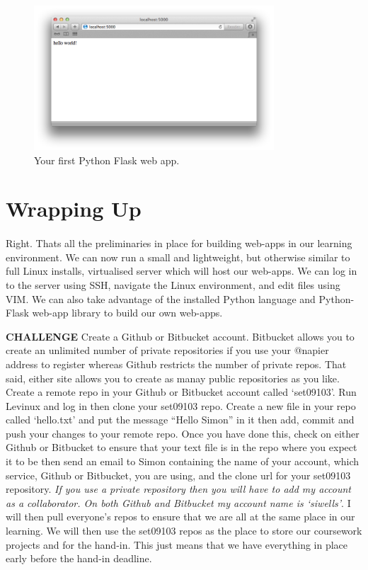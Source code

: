 \documentclass[12pt, a4paper, twoside]{book}
\begin{document}
\begin{figure}[H]
\centering
\includegraphics[width=0.8\textwidth]{images/flask-hello-napier.png}
\caption{Your first Python Flask web app.}
\label{fig:flask-hello-napier}
\end{figure}

\section{Wrapping Up}
\label{chapter_02_wrap-up}
\paragraph{} Right. Thats all the preliminaries in place for building web-apps in our learning environment. We can now run a small and lightweight, but otherwise similar to full Linux installs, virtualised server which will host our web-apps. We can log in to the server using SSH, navigate the Linux environment, and edit files using VIM. We can also take advantage of the installed Python language and Python-Flask web-app library to build our own web-apps.

\begin{framed}
\textbf{CHALLENGE} Create a Github or Bitbucket account. Bitbucket allows you to create an unlimited number of private repositories if you use your @napier address to register whereas Github restricts the number of private repos. That said, either site allows you to create as manay public repositories as you like. Create a remote repo in your Github or Bitbucket account called `set09103'. Run Levinux and log in then clone your set09103 repo. Create a new file in your repo called `hello.txt' and put the message ``Hello Simon'' in it then add, commit and push your changes to your remote repo. Once you have done this, check on either Github or Bitbucket to ensure that your text file is in the repo where you expect it to be then send an email to Simon containing the name of your account, which service, Github or Bitbucket, you are using, and the clone url for your set09103 repository. {\emph{If you use a private repository then you will have to add my account as a collaborator. On both Github and Bitbucket my account name is `siwells'}}. I will then pull everyone's repos to ensure that we are all at the same place in our learning. We will then use the set09103 repos as the place to store our coursework projects and for the hand-in. This just means that we have everything in place early before the hand-in deadline.
\end{framed}
\end{document}
